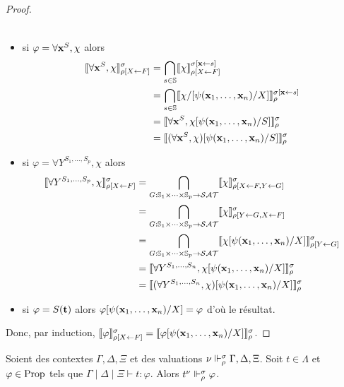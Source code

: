 \documentclass{article}
\begin{document}
\begin{proof}
\begin{itemize}
\begin{align*}
    \end{align*}
  \item si $\varphi = \forall \mathbf{x}^S, \chi$ alors
    \begin{align*}
      \llbracket \forall \mathbf{x}^S, \chi \rrbracket_{\rho[X\leftarrow F]}^\sigma &= \bigcap_{s\in\mathbb{S}}\llbracket \chi \rrbracket_{\rho[X\leftarrow F]}^{\sigma[\mathbf{x}\leftarrow s]}\\
      &= \bigcap_{s\in\mathbb{S}}\llbracket \chi/[\psi(\mathbf{x}_1,\ldots,\mathbf{x}_n)/X] \rrbracket_\rho^{\sigma[\mathbf{x}\leftarrow s]}\\
      &= \llbracket \forall \mathbf{x}^S, \chi[\psi(\mathbf{x}_1,\ldots,\mathbf{x}_n)/S] \rrbracket_\rho^\sigma\\
      &= \llbracket (\forall \mathbf{x}^S, \chi)[\psi(\mathbf{x}_1,\ldots,\mathbf{x}_n)/S] \rrbracket_\rho^\sigma
    \end{align*}
  \item si $\varphi = \forall Y^{S_1,\ldots,S_p},\chi$ alors
    \begin{align*}
      \llbracket \forall Y^{S_1,\ldots,S_p}, \chi \rrbracket_{\rho[X\leftarrow F]}^\sigma &= \bigcap_{G : \mathbb{S}_1\times\cdots\times\mathbb{S}_p \to \mathcal {SAT}}\llbracket \chi \rrbracket_{\rho[X\leftarrow F, Y\leftarrow G]}^\sigma\\
      &= \bigcap_{G : \mathbb{S}_1\times\cdots\times\mathbb{S}_p\to\mathcal {SAT}}\llbracket \chi \rrbracket_{\rho[Y\leftarrow G, X\leftarrow F]}^\sigma\\
      &= \bigcap_{G : \mathbb{S}_1\times\cdots\times\mathbb{S}_p\to\mathcal {SAT}}\llbracket \chi[\psi(\mathbf{x}_1,\ldots,\mathbf{x}_n)/X] \rrbracket_{\rho[Y\leftarrow G]}^\sigma\\
      &= \llbracket \forall Y^{S_1,\ldots,S_n}, \chi[\psi(\mathbf{x}_1,\ldots,\mathbf{x}_n)/X] \rrbracket_\rho^\sigma\\
      &= \llbracket (\forall Y^{S_1,\ldots,S_n}, \chi)[\psi(\mathbf{x}_1,\ldots,\mathbf{x}_n)/X] \rrbracket_\rho^\sigma
    \end{align*}
  \item si $\varphi = S(\mathbf{t})$ alors $\varphi[\psi(\mathbf{x}_1,\ldots,\mathbf{x}_n)/X] = \varphi$ d'où le résultat.
  \end{itemize}
  Donc, par induction, $\llbracket \varphi \rrbracket_{\rho[X\leftarrow F]}^\sigma = \llbracket \varphi[\psi(\mathbf{x}_1,\ldots,\mathbf{x}_n)/X] \rrbracket_\rho^\sigma$.
\end{proof}

\begin{lem}[Adéquation]
  Soient des contextes $\Gamma,\Delta,\Xi$ et des valuations $\nu\Vdash_\rho^\sigma \Gamma,\Delta,\Xi$. Soit $t\in\Lambda$ et $\varphi\in\mathrm{Prop}$ tels que $\Gamma\mid\Delta\mid\Xi\vdash t : \varphi$. Alors $t^\nu \Vdash_\rho^\sigma \varphi$.
\end{lem}
\end{document}
